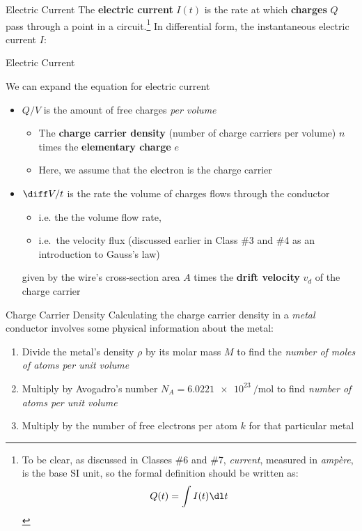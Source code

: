 \documentclass[12pt,aspectratio=169]{beamer}
\begin{document}
\begin{frame}{Electric Current}
  The \textbf{electric current} $I(t)$ is the rate at which \textbf{charges}
  $Q$ pass through a point in a circuit.\footnote{To be clear, as discussed in
  Classes \#6 and \#7, \emph{current}, measured in \emph{amp\`{e}re}, is the
  base SI unit, so the formal definition should be written as:
  \begin{displaymath}
    Q(t)=\int I(t)\dl t
  \end{displaymath}
  } In differential form, the instantaneous electric current $I$:
  
\end{frame}

\begin{frame}{Electric Current}

  We can expand the equation for electric current
  
  \begin{itemize}
  \item $Q/V$ is the amount of free charges \emph{per volume}
    \begin{itemize}
    \item The \textbf{charge carrier density} (number of charge carriers per
      volume) $n$ times the \textbf{elementary charge} $e$
    \item Here, we assume that the electron is the charge carrier
    \end{itemize}
  \item $\diff V/t$ is the rate the volume of charges flows through the
    conductor
    \begin{itemize}
    \item i.e. the the volume flow rate,
    \item i.e.\ the velocity flux (discussed earlier in Class \#3 and \#4 as an
      introduction to Gauss's law)
    \end{itemize}
    given by the wire's cross-section area $A$ times the
    \textbf{drift velocity} $v_d$ of the charge carrier
  \end{itemize}
\end{frame}



\begin{frame}{Charge Carrier Density}
  Calculating the charge carrier density in a \emph{metal} conductor involves
  some physical information about the metal:
  \begin{enumerate}
  \item Divide the metal's density $\rho$ by its molar mass $M$ to find the
    \emph{number of moles of atoms per unit volume}
  \item Multiply by Avogadro's number $N_A=\SI{6.0221e23}{\per\mol}$ to find
    \emph{number of atoms per unit volume}
  \item Multiply by the number of free electrons per atom $k$ for that
    particular metal
  \end{enumerate}
\end{frame}
\end{document}
